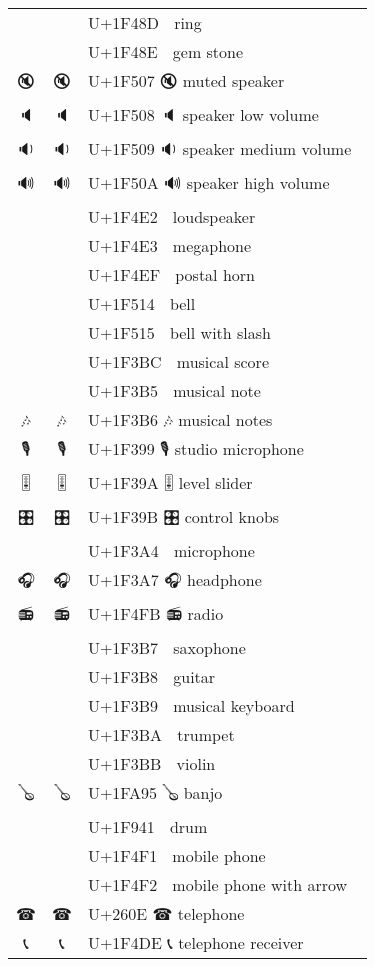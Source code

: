 \documentclass[a4paper,12pt]{ltjarticle}
\newcommand{\fontA}[1]{{\fontspec[RawFeature={mode=harf,+dist,+ccmp}]{Segoe UI Emoji} #1}}
\newcommand{\fontB}[1]{{\fontspec[RawFeature={mode=harf,+dist,+ccmp}]{Noto Color Emoji} #1}}
\begin{document}
\begin{longtable}[c]{ccp{0.8\linewidth}}
\fontA{💍}&\fontB{💍}&U+1F48D 💍 ring\\
\fontA{💎}&\fontB{💎}&U+1F48E 💎 gem stone\\
\fontA{🔇}&\fontB{🔇}&U+1F507 🔇 muted speaker\\
\fontA{🔈}&\fontB{🔈}&U+1F508 🔈 speaker low volume\\
\fontA{🔉}&\fontB{🔉}&U+1F509 🔉 speaker medium volume\\
\fontA{🔊}&\fontB{🔊}&U+1F50A 🔊 speaker high volume\\
\fontA{📢}&\fontB{📢}&U+1F4E2 📢 loudspeaker\\
\fontA{📣}&\fontB{📣}&U+1F4E3 📣 megaphone\\
\fontA{📯}&\fontB{📯}&U+1F4EF 📯 postal horn\\
\fontA{🔔}&\fontB{🔔}&U+1F514 🔔 bell\\
\fontA{🔕}&\fontB{🔕}&U+1F515 🔕 bell with slash\\
\fontA{🎼}&\fontB{🎼}&U+1F3BC 🎼 musical score\\
\fontA{🎵}&\fontB{🎵}&U+1F3B5 🎵 musical note\\
\fontA{🎶}&\fontB{🎶}&U+1F3B6 🎶 musical notes\\
\fontA{🎙}&\fontB{🎙}&U+1F399 🎙 studio microphone\\
\fontA{🎚}&\fontB{🎚}&U+1F39A 🎚 level slider\\
\fontA{🎛}&\fontB{🎛}&U+1F39B 🎛 control knobs\\
\fontA{🎤}&\fontB{🎤}&U+1F3A4 🎤 microphone\\
\fontA{🎧}&\fontB{🎧}&U+1F3A7 🎧 headphone\\
\fontA{📻}&\fontB{📻}&U+1F4FB 📻 radio\\
\fontA{🎷}&\fontB{🎷}&U+1F3B7 🎷 saxophone\\
\fontA{🎸}&\fontB{🎸}&U+1F3B8 🎸 guitar\\
\fontA{🎹}&\fontB{🎹}&U+1F3B9 🎹 musical keyboard\\
\fontA{🎺}&\fontB{🎺}&U+1F3BA 🎺 trumpet\\
\fontA{🎻}&\fontB{🎻}&U+1F3BB 🎻 violin\\
\fontA{🪕}&\fontB{🪕}&U+1FA95 🪕 banjo\\
\fontA{🥁}&\fontB{🥁}&U+1F941 🥁 drum\\
\fontA{📱}&\fontB{📱}&U+1F4F1 📱 mobile phone\\
\fontA{📲}&\fontB{📲}&U+1F4F2 📲 mobile phone with arrow\\
\fontA{☎}&\fontB{☎}&U+260E ☎ telephone\\
\fontA{📞}&\fontB{📞}&U+1F4DE 📞 telephone receiver\\

\end{longtable}
\end{document}
